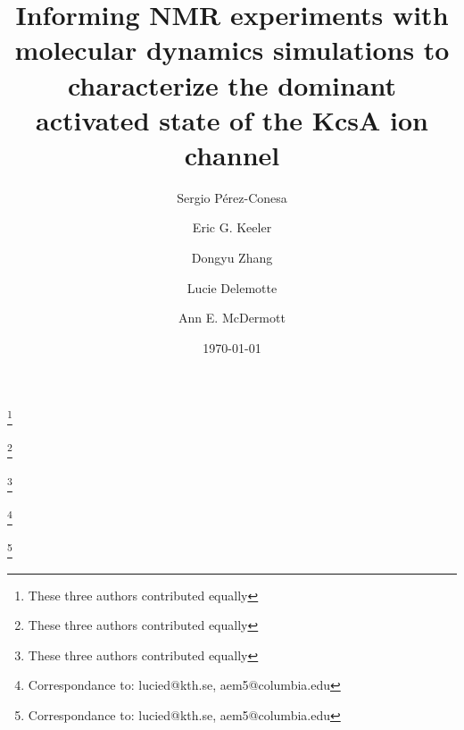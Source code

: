 \documentclass[%
 aip,
 amsmath,amssymb,
 preprint,%
]{revtex4-1}
\begin{document}

\title[The dominant activated state of KcsA]{Informing NMR experiments with molecular dynamics simulations to characterize the dominant activated state of the KcsA ion channel}

\author{Sergio P{\'e}rez-Conesa}
\thanks{These three authors contributed equally}

\author{Eric G. Keeler}
\thanks{These three authors contributed equally}

\author{Dongyu Zhang}
\thanks{These three authors contributed equally}

\author{Lucie Delemotte}
\thanks{Correspondance to: lucied@kth.se, aem5@columbia.edu }

\author{Ann E. McDermott}
\thanks{Correspondance to: lucied@kth.se, aem5@columbia.edu }

\date{\today}%
\end{document}
